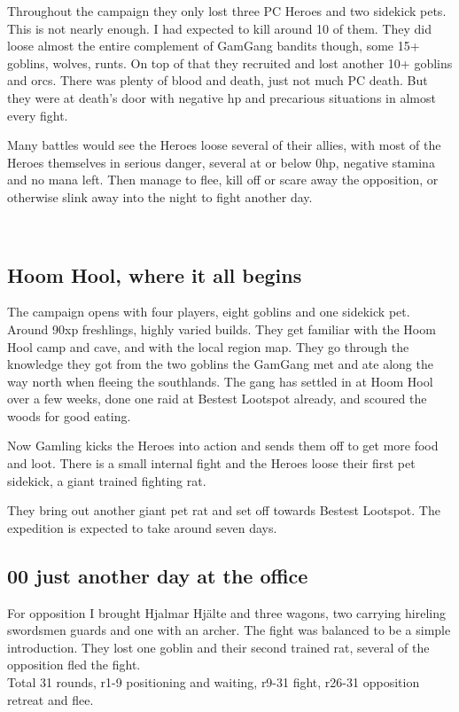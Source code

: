 \noindent Throughout the campaign they only lost three PC Heroes and two sidekick pets. This is not nearly enough. I had expected to kill around 10 of them. They did loose almost the entire complement of GamGang bandits though, some 15+ goblins, wolves, runts. On top of that they recruited and lost another 10+ goblins and orcs. There was plenty of blood and death, just not much PC death. But they were at death's door with negative hp and precarious situations in almost every fight.

Many battles would see the Heroes loose several of their allies, with most of the Heroes themselves in serious danger, several at or below 0hp, negative stamina and no mana left. Then manage to flee, kill off or scare away the opposition, or otherwise slink away into the night to fight another day.

\


\subsection*{Hoom Hool, where it all begins}                            %

The campaign opens with four players, eight goblins and one sidekick pet. Around 90xp freshlings, highly varied builds. They get familiar with the Hoom Hool camp and cave, and with the local region map. They go through the knowledge they got from the two goblins the GamGang met and ate along the way north when fleeing the southlands. The gang has settled in at Hoom Hool over a few weeks, done one raid at Bestest Lootspot already, and scoured the woods for good eating.

Now Gamling kicks the Heroes into action and sends them off to get more food and loot. There is a small internal fight and the Heroes loose their first pet sidekick, a giant trained fighting rat. 

They bring out another giant pet rat and set off towards Bestest Lootspot. The expedition is expected to take around seven days.


\subsection*{00 just another day at the office}

For opposition I brought Hjalmar Hjälte and three wagons, two carrying hireling swordsmen guards and one with an archer.
The fight was balanced to be a simple introduction. They lost one goblin and their second trained rat, several of the opposition fled the fight.\\
Total 31 rounds, r1-9 positioning and waiting, r9-31 fight, r26-31 opposition retreat and flee.

